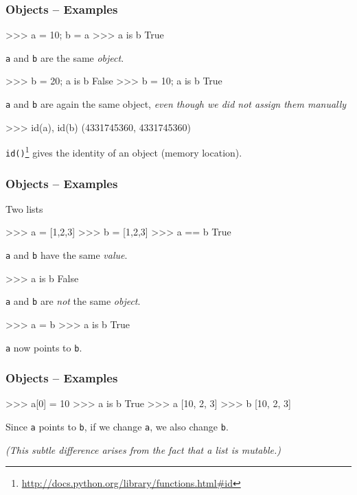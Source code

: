 \documentclass[xetex,10pt]{beamer}
\def\pythoni{\lstinline[language=pythontim]}
\begin{document}
\begin{frame}[fragile]
	\frametitle{Objects -- Examples}

\begin{python}
>>> a = 10; b = a
>>> a is b
True
\end{python}

\pythoni{a} and \pythoni{b} are the same \emph{object}.

\begin{python}
>>> b = 20; a is b
False
>>> b = 10; a is b
True
\end{python}

\pythoni{a} and \pythoni{b} are again the same object, \emph{even though we did not assign them manually}

\begin{python}
>>> id(a), id(b)
(4331745360, 4331745360)
\end{python}

\pythoni{id()}\footnote[frame]{\url{http://docs.python.org/library/functions.html\#id}} gives the identity of an object (memory location).

\end{frame}

\begin{frame}[fragile]
	\frametitle{Objects -- Examples}

Two lists
\begin{python}
>>> a = [1,2,3]
>>> b = [1,2,3]
>>> a == b
True
\end{python}

\pythoni{a} and \pythoni{b} have the same \emph{value}.	

\begin{python}
>>> a is b
False
\end{python}

\pythoni{a} and \pythoni{b} are \emph{not} the same \emph{object}.	

\begin{python}
>>> a = b
>>> a is b
True
\end{python}

\pythoni{a} now points to \pythoni{b}.

\end{frame}


\begin{frame}[fragile]
	\frametitle{Objects -- Examples}

\begin{python}
>>> a[0] = 10
>>> a is b
True
>>> a
[10, 2, 3]
>>> b
[10, 2, 3]
\end{python}

Since \pythoni{a} points to \pythoni{b}, if we change \pythoni{a}, we also change \pythoni{b}.

	\vspace*{1em}

\emph{(This subtle difference arises from the fact that a list is mutable.)}

\end{frame}
\end{document}

